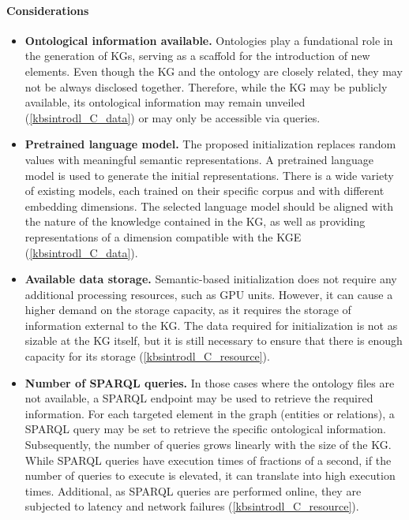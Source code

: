 \paragraph{Considerations}
\begin{itemize}
    \item \textbf{Ontological information available.} Ontologies play a fundational role in the generation of KGs, serving as a scaffold for the introduction of new elements. Even though the KG and the ontology are closely related, they may not be always disclosed together. Therefore, while the KG may be publicly available, its ontological information may remain unveiled (\ref{kbsintrodl_C_data}) or may only be accessible via queries.
    
    \item \textbf{Pretrained language model.} The proposed initialization replaces random values with meaningful semantic representations. A pretrained language model is used to generate the initial representations. There is a wide variety of existing models, each trained on their specific corpus and with different embedding dimensions. The selected language model should be aligned with the nature of the knowledge contained in the KG, as well as providing representations of a dimension compatible with the KGE (\ref{kbsintrodl_C_data}).
    
    \item \textbf{Available data storage.} Semantic-based initialization does not require any additional processing resources, such as GPU units. However, it can cause a higher demand on the storage capacity, as it requires the storage of information external to the KG. The data required for initialization is not as sizable at the KG itself, but it is still necessary to ensure that there is enough capacity for its storage (\ref{kbsintrodl_C_resource}).
    
    \item \textbf{Number of SPARQL queries.} In those cases where the ontology files are not available, a SPARQL endpoint may be used to retrieve the required information. For each targeted element in the graph (entities or relations), a SPARQL query may be set to retrieve the specific ontological information. Subsequently, the number of queries grows linearly with the size of the KG. While SPARQL queries have execution times of fractions of a second, if the number of queries to execute is elevated, it can translate into high execution times. Additional, as SPARQL queries are performed online, they are subjected to latency and network failures (\ref{kbsintrodl_C_resource}). 
\end{itemize}
